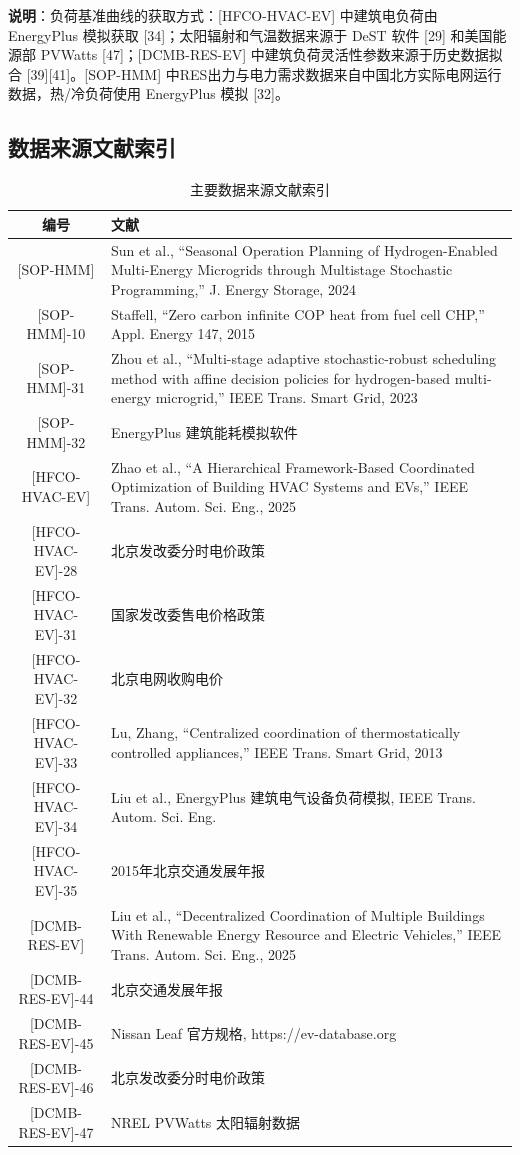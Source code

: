 \documentclass[11pt]{ctexart}
\begin{document}
\textbf{说明}：负荷基准曲线的获取方式：{[HFCO-HVAC-EV]} 中建筑电负荷由 EnergyPlus 模拟获取 {[34]}；太阳辐射和气温数据来源于 DeST 软件 {[29]} 和美国能源部 PVWatts {[47]}；{[DCMB-RES-EV]} 中建筑负荷灵活性参数来源于历史数据拟合 {[39]}{[41]}。{[SOP-HMM]} 中RES出力与电力需求数据来自中国北方实际电网运行数据，热/冷负荷使用 EnergyPlus 模拟 {[32]}。

\subsection{数据来源文献索引}

\begin{table}[htbp]
\centering
\caption{主要数据来源文献索引}
\begin{tabular}{cp{12cm}}
\hline
编号 & 文献 \\
\hline
{[SOP-HMM]} & Sun et al., ``Seasonal Operation Planning of Hydrogen-Enabled Multi-Energy Microgrids through Multistage Stochastic Programming,'' J. Energy Storage, 2024 \\
{[SOP-HMM]-10} & Staffell, ``Zero carbon infinite COP heat from fuel cell CHP,'' Appl. Energy 147, 2015 \\
{[SOP-HMM]-31} & Zhou et al., ``Multi-stage adaptive stochastic-robust scheduling method with affine decision policies for hydrogen-based multi-energy microgrid,'' IEEE Trans. Smart Grid, 2023 \\
{[SOP-HMM]-32} & EnergyPlus 建筑能耗模拟软件 \\
{[HFCO-HVAC-EV]} & Zhao et al., ``A Hierarchical Framework-Based Coordinated Optimization of Building HVAC Systems and EVs,'' IEEE Trans. Autom. Sci. Eng., 2025 \\
{[HFCO-HVAC-EV]-28} & 北京发改委分时电价政策 \\
{[HFCO-HVAC-EV]-31} & 国家发改委售电价格政策 \\
{[HFCO-HVAC-EV]-32} & 北京电网收购电价 \\
{[HFCO-HVAC-EV]-33} & Lu, Zhang, ``Centralized coordination of thermostatically controlled appliances,'' IEEE Trans. Smart Grid, 2013 \\
{[HFCO-HVAC-EV]-34} & Liu et al., EnergyPlus 建筑电气设备负荷模拟, IEEE Trans. Autom. Sci. Eng. \\
{[HFCO-HVAC-EV]-35} & 2015年北京交通发展年报 \\
{[DCMB-RES-EV]} & Liu et al., ``Decentralized Coordination of Multiple Buildings With Renewable Energy Resource and Electric Vehicles,'' IEEE Trans. Autom. Sci. Eng., 2025 \\
{[DCMB-RES-EV]-44} & 北京交通发展年报 \\
{[DCMB-RES-EV]-45} & Nissan Leaf 官方规格, https://ev-database.org \\
{[DCMB-RES-EV]-46} & 北京发改委分时电价政策 \\
{[DCMB-RES-EV]-47} & NREL PVWatts 太阳辐射数据 \\
\hline
\end{tabular}
\end{table}
\end{document}
